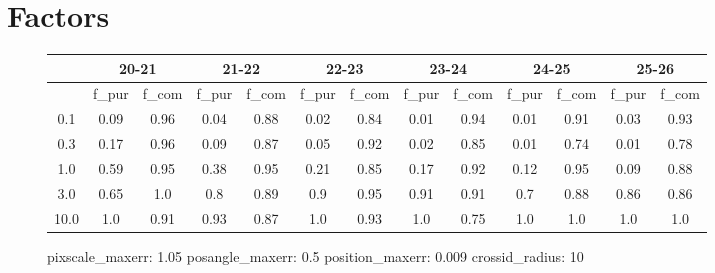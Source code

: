 \documentclass{article}
\begin{document}
\newpage\null\newpage

\section{Factors}

\begin{figure}[H]
\centering
\begin{tabular}{|c|c|c|c|c|c|c|c|c|c|c|c|c|}
\hline
\multicolumn{1}{|c|}{} & \multicolumn{2}{|c|}{20-21} & \multicolumn{2}{|c|}{21-22} & \multicolumn{2}{|c|}{22-23} & \multicolumn{2}{|c|}{23-24} & \multicolumn{2}{|c|}{24-25} & \multicolumn{2}{|c|}{25-26}\\
\hline \hline
 & f\_pur & f\_com & f\_pur & f\_com & f\_pur & f\_com & f\_pur & f\_com & f\_pur & f\_com & f\_pur & f\_com \\
\hline
0.1 & 0.09 & 0.96 & 0.04 & 0.88 & 0.02 & 0.84 & 0.01 & 0.94 & 0.01 & 0.91 & 0.03 & 0.93\\
\hline
0.3 & 0.17 & 0.96 & 0.09 & 0.87 & 0.05 & 0.92 & 0.02 & 0.85 & 0.01 & 0.74 & 0.01 & 0.78\\
\hline
1.0 & 0.59 & 0.95 & 0.38 & 0.95 & 0.21 & 0.85 & 0.17 & 0.92 & 0.12 & 0.95 & 0.09 & 0.88\\
\hline
3.0 & 0.65 & 1.0 & 0.8 & 0.89 & 0.9 & 0.95 & 0.91 & 0.91 & 0.7 & 0.88 & 0.86 & 0.86\\
\hline
10.0 & 1.0 & 0.91 & 0.93 & 0.87 & 1.0 & 0.93 & 1.0 & 0.75 & 1.0 & 1.0 & 1.0 & 1.0\\
\hline
\end{tabular}
\caption{pixscale\_maxerr: 1.05 posangle\_maxerr: 0.5 position\_maxerr: 0.009 crossid\_radius: 10}
\end{figure}
\end{document}
